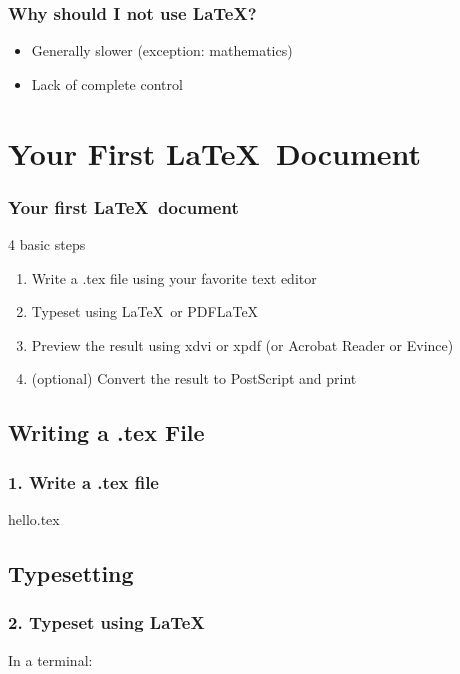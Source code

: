 \documentclass[ignorenonframetext]{beamer}
\newcommand{\abbr}[1]{#1}
\newcommand{\latexinput}[1]{\lstset{language=[LaTeX]TeX}}
\begin{document}
\begin{frame}
  \frametitle{Why should I not use \LaTeX?}
  \begin{itemize}
  \item Generally slower (exception: mathematics)
  \item Lack of complete control
  \end{itemize}
\end{frame}


\section{Your First \LaTeX\ Document}
\begin{frame}
  \frametitle{Your first \LaTeX\ document}
  \begin{block}{4 basic steps}
    \begin{enumerate}
    \item Write a .tex file using your favorite text editor
    \item Typeset using \LaTeX\ or \abbr{PDF}\LaTeX
    \item Preview the result using xdvi or xpdf (or Acrobat Reader or Evince)
    \item (optional) Convert the result to PostScript and print
    \end{enumerate}
  \end{block}
\end{frame}

\subsection{Writing a .tex File}
\begin{frame}
  \frametitle{1. Write a .tex file}
  \begin{block}{hello.tex}
    \latexinput{code/hello.tex}
  \end{block}
\end{frame}

\subsection{Typesetting}
\begin{frame}
  \frametitle{2. Typeset using \LaTeX}
  \begin{block}{In a terminal:}
    
  \end{block}
\end{frame}
\end{document}
